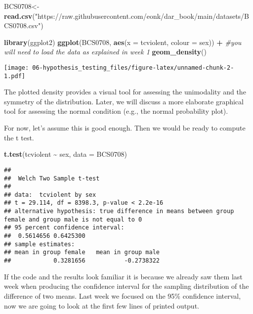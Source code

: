 \documentclass[
]{book}
\newenvironment{Shaded}{\begin{snugshade}}{\end{snugshade}}
\newcommand{\AttributeTok}[1]{\textcolor[rgb]{0.13,0.29,0.53}{#1}}
\newcommand{\CommentTok}[1]{\textcolor[rgb]{0.56,0.35,0.01}{\textit{#1}}}
\newcommand{\FunctionTok}[1]{\textcolor[rgb]{0.13,0.29,0.53}{\textbf{#1}}}
\newcommand{\NormalTok}[1]{#1}
\newcommand{\OtherTok}[1]{\textcolor[rgb]{0.56,0.35,0.01}{#1}}
\newcommand{\SpecialCharTok}[1]{\textcolor[rgb]{0.81,0.36,0.00}{\textbf{#1}}}
\newcommand{\StringTok}[1]{\textcolor[rgb]{0.31,0.60,0.02}{#1}}
\begin{document}
\begin{Shaded}
\begin{Highlighting}[]
\NormalTok{BCS0708}\OtherTok{\textless{}{-}}\FunctionTok{read.csv}\NormalTok{(}\StringTok{"https://raw.githubusercontent.com/eonk/dar\_book/main/datasets/BCS0708.csv"}\NormalTok{)}
\end{Highlighting}
\end{Shaded}

\begin{Shaded}
\begin{Highlighting}[]
\FunctionTok{library}\NormalTok{(ggplot2)}
\FunctionTok{ggplot}\NormalTok{(BCS0708, }\FunctionTok{aes}\NormalTok{(}\AttributeTok{x =}\NormalTok{ tcviolent, }\AttributeTok{colour =}\NormalTok{ sex)) }\SpecialCharTok{+} \CommentTok{\#you will need to load the data as explained in week 1}
  \FunctionTok{geom\_density}\NormalTok{() }
\end{Highlighting}
\end{Shaded}

\texttt{[image: 06-hypothesis\_testing\_files/figure-latex/unnamed-chunk-2-1.pdf]}

The plotted density provides a visual tool for assessing the unimodality and the symmetry of the distribution. Later, we will discuss a more elaborate graphical tool for assessing the normal condition (e.g., the normal probability plot).

For now, let's assume this is good enough. Then we would be ready to compute the t test.

\begin{Shaded}
\begin{Highlighting}[]
\FunctionTok{t.test}\NormalTok{(tcviolent }\SpecialCharTok{\textasciitilde{}}\NormalTok{ sex, }\AttributeTok{data =}\NormalTok{ BCS0708)}
\end{Highlighting}
\end{Shaded}

\begin{verbatim}
## 
##  Welch Two Sample t-test
## 
## data:  tcviolent by sex
## t = 29.114, df = 8398.3, p-value < 2.2e-16
## alternative hypothesis: true difference in means between group female and group male is not equal to 0
## 95 percent confidence interval:
##  0.5614656 0.6425300
## sample estimates:
## mean in group female   mean in group male 
##            0.3281656           -0.2738322
\end{verbatim}

If the code and the results look familiar it is because we already saw them last week when producing the confidence interval for the sampling distribution of the difference of two means. Last week we focused on the 95\% confidence interval, now we are going to look at the first few lines of printed output.
\end{document}
